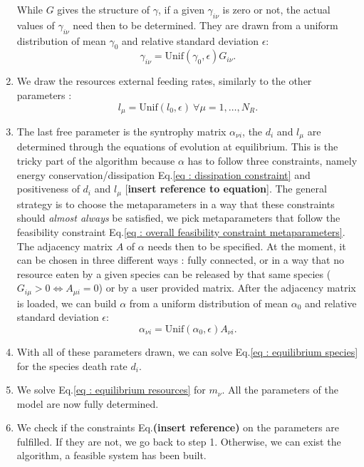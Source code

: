 \documentclass[12pt, titlepage]{report}
\begin{document}
\begin{enumerate}
  While $G$ gives the structure of $\gamma$, \ie if a given $\gamma_{i\nu}$ is zero or not, the actual values of $\gamma_{i\nu}$ need then to be determined. They are drawn from a uniform distribution of mean $\gamma_0$ and relative standard deviation $\epsilon$:
  \begin{equation}
    \gamma_{i\nu} = \text{Unif}(\gamma_0, \epsilon) G_{i\nu}.
  \end{equation}
  \item We draw the resources external feeding rates, similarly to the other parameters :
  \begin{equation}
  l_\mu = \text{Unif}(l_0, \epsilon) \ \forall \mu=1, \dots, N_R.
  \end{equation}
  \item The last free parameter is the syntrophy matrix $\alpha_{\nu i}$, the $d_i$ and $l_\mu$ are determined through the equations of evolution at equilibrium. This is the tricky part of the algorithm because $\alpha$ has to follow three constraints, namely energy conservation/dissipation Eq.\eqref{eq : dissipation constraint} and positiveness of $d_i$ and $l_\mu$ [\textbf{insert reference to equation}]. The general strategy is to choose the metaparameters in a way that these constraints should \textit{almost always} be satisfied, \ie we pick metaparameters that follow the feasibility constraint Eq.\eqref{eq : overall feasibility constraint metaparameters}. The adjacency matrix $A$ of $\alpha$ needs then to be specified. At the moment, it can be chosen in three different ways : fully connected, or in a way that no resource eaten by a given species can be released by that same species (\ie $G_{i\mu}>0 \iff A_{\mu i}=0$) or by a user provided matrix. After the adjacency matrix is loaded, we can build $\alpha$ from a uniform distribution of mean $\alpha_0$ and relative standard deviation $\epsilon$:
  \begin{equation}
    \alpha_{\nu i} = \text{Unif}(\alpha_0, \epsilon) A_{\nu i} .
  \end{equation}
  \item With all of these parameters drawn, we can solve Eq.\eqref{eq : equilibrium species} for the species death rate $d_i$.
  \item We solve Eq.\eqref{eq : equilibrium resources} for $m_\nu$. All the parameters of the model are now fully determined.
  \item We check if the constraints Eq.\textbf{(insert reference)} on the parameters are fulfilled. If they are not, we go back to step 1. Otherwise, we can exist the algorithm, a feasible system has been built.
\end{enumerate}
\end{document}
